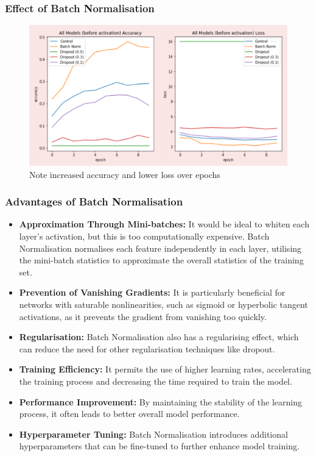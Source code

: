 \subsubsection*{Effect of Batch Normalisation}
\begin{figure}[H]
    \centering
    \includegraphics[width=0.65\linewidth]{img/bneffect.png}
    \caption{Note increased accuracy and lower loss over epochs}
\end{figure}


\subsubsection*{Advantages of Batch Normalisation}
\begin{itemize}
    \item \textbf{Approximation Through Mini-batches:} It would be ideal to whiten each layer's activation, but this is too computationally expensive. Batch Normalisation normalises each feature independently in each layer, utilising the mini-batch statistics to approximate the overall statistics of the training set.
    \item \textbf{Prevention of Vanishing Gradients:} It is particularly beneficial for networks with saturable nonlinearities, such as sigmoid or hyperbolic tangent activations, as it prevents the gradient from vanishing too quickly.
    \item \textbf{Regularisation:} Batch Normalisation also has a regularising effect, which can reduce the need for other regularisation techniques like dropout.
    \item \textbf{Training Efficiency:} It permits the use of higher learning rates, accelerating the training process and decreasing the time required to train the model.
    \item \textbf{Performance Improvement:} By maintaining the stability of the learning process, it often leads to better overall model performance.
    \item \textbf{Hyperparameter Tuning:} Batch Normalisation introduces additional hyperparameters that can be fine-tuned to further enhance model training.
\end{itemize}

